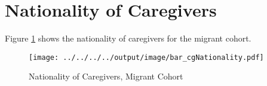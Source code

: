 

\section{Nationality of Caregivers}

Figure \ref{fig:cg-nationality} shows the nationality of caregivers for the migrant cohort.

\begin{figure}[H] \caption{Nationality of Caregivers, Migrant Cohort} \label{fig:cg-nationality}
\centering
\texttt{[image: ../../../../output/image/bar\_cgNationality.pdf]}
\end{figure}
